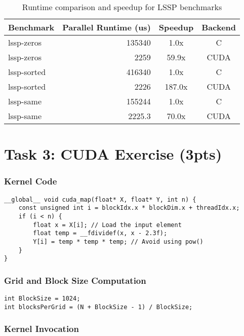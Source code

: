 \documentclass{article}
\begin{document}
    \begin{table}[h]
    \centering
    \begin{tabular}{|l|r|c|c|}
    \hline
    \textbf{Benchmark} & \textbf{Parallel Runtime (us)} & \textbf{Speedup} & \textbf{Backend} \\
    \hline
    lssp-zeros & 135340 & 1.0x & C \\
    lssp-zeros & 2259 & 59.9x & CUDA \\
    lssp-sorted & 416340 & 1.0x & C \\
    lssp-sorted & 2226 & 187.0x & CUDA \\
    lssp-same & 155244 & 1.0x & C \\
    lssp-same & 2225.3 & 70.0x & CUDA \\
    \hline
    \end{tabular}
    \caption{Runtime comparison and speedup for LSSP benchmarks}
    \label{tab:lssp-benchmarks}
    \end{table}
\newpage

\section{Task 3: CUDA Exercise (3pts)}

\subsubsection{Kernel Code}

\begin{lstlisting}[language=cuda]
__global__ void cuda_map(float* X, float* Y, int n) {
    const unsigned int i = blockIdx.x * blockDim.x + threadIdx.x;
    if (i < n) {
        float x = X[i]; // Load the input element
        float temp = __fdividef(x, x - 2.3f); 
        Y[i] = temp * temp * temp; // Avoid using pow()
    }
}
\end{lstlisting}

\subsubsection{Grid and Block Size Computation}

\begin{lstlisting}[language=cuda]
int BlockSize = 1024;
int blocksPerGrid = (N + BlockSize - 1) / BlockSize;
\end{lstlisting}

\subsubsection{Kernel Invocation}
\end{document}
